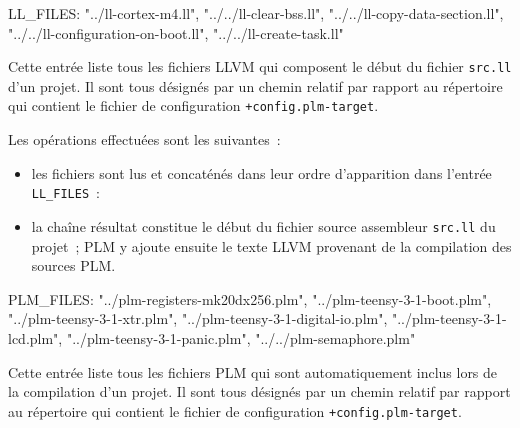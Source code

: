 
\begin{PLM}
LL_FILES:
  "../ll-cortex-m4.ll",
  "../../ll-clear-bss.ll",
  "../../ll-copy-data-section.ll",
  "../../ll-configuration-on-boot.ll",
  "../../ll-create-task.ll"
\end{PLM}

Cette entrée liste tous les fichiers LLVM qui composent le début du fichier \texttt{src.ll} d'un projet. Il sont tous désignés par un chemin relatif par rapport au répertoire qui contient le fichier de configuration \texttt{+config.plm-target}.

Les opérations effectuées sont les suivantes~:
\begin{itemize}
  \item les fichiers sont lus et concaténés dans leur ordre d'apparition dans l'entrée \texttt{LL\_FILES}~:
  \item la chaîne résultat constitue le début du fichier source assembleur \texttt{src.ll} du projet~; PLM y ajoute ensuite le texte LLVM provenant de la compilation des sources PLM.
\end{itemize}














\begin{PLM}
PLM_FILES:
  "../plm-registers-mk20dx256.plm",
  "../plm-teensy-3-1-boot.plm",
  "../plm-teensy-3-1-xtr.plm",
  "../plm-teensy-3-1-digital-io.plm",
  "../plm-teensy-3-1-lcd.plm",
  "../plm-teensy-3-1-panic.plm",
  "../../plm-semaphore.plm"
\end{PLM}

Cette entrée liste tous les fichiers PLM qui sont automatiquement inclus lors de la compilation d'un projet. Il sont tous désignés par un chemin relatif par rapport au répertoire qui contient le fichier de configuration \texttt{+config.plm-target}.








